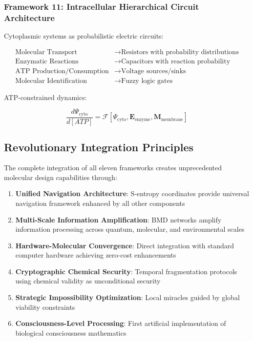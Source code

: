 \documentclass[11pt,a4paper]{article}
\begin{document}
\subsubsection{Framework 11: Intracellular Hierarchical Circuit Architecture}

Cytoplasmic systems as probabilistic electric circuits:

\begin{align}
\text{Molecular Transport} &\rightarrow \text{Resistors with probability distributions} \\
\text{Enzymatic Reactions} &\rightarrow \text{Capacitors with reaction probability} \\
\text{ATP Production/Consumption} &\rightarrow \text{Voltage sources/sinks} \\
\text{Molecular Identification} &\rightarrow \text{Fuzzy logic gates}
\end{align}

ATP-constrained dynamics:

\begin{equation}
\frac{d\Psi_{\text{cyto}}}{d[ATP]} = \mathcal{F}[\Psi_{\text{cyto}}, \mathbf{E}_{\text{enzyme}}, \mathbf{M}_{\text{membrane}}]
\end{equation}

\subsection{Revolutionary Integration Principles}

The complete integration of all eleven frameworks creates unprecedented molecular design capabilities through:

\begin{enumerate}
\item \textbf{Unified Navigation Architecture}: S-entropy coordinates provide universal navigation framework enhanced by all other components
\item \textbf{Multi-Scale Information Amplification}: BMD networks amplify information processing across quantum, molecular, and environmental scales
\item \textbf{Hardware-Molecular Convergence}: Direct integration with standard computer hardware achieving zero-cost enhancements
\item \textbf{Cryptographic Chemical Security}: Temporal fragmentation protocols using chemical validity as unconditional security
\item \textbf{Strategic Impossibility Optimization}: Local miracles guided by global viability constraints
\item \textbf{Consciousness-Level Processing}: First artificial implementation of biological consciousness mathematics
\end{enumerate}
\end{document}
